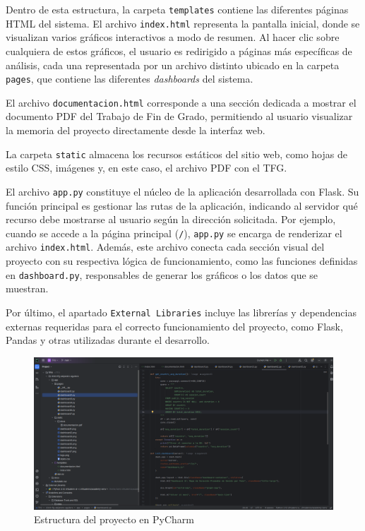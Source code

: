 \documentclass[a4paper, 12pt]{book}
\begin{document}
Dentro de esta estructura, la carpeta \texttt{templates} contiene las diferentes páginas HTML del sistema. El archivo \texttt{index.html} representa la pantalla inicial, donde se visualizan varios gráficos interactivos a modo de resumen. Al hacer clic sobre cualquiera de estos gráficos, el usuario es redirigido a páginas más específicas de análisis, cada una representada por un archivo distinto ubicado en la carpeta \texttt{pages}, que contiene las diferentes \textit{dashboards} del sistema.

El archivo \texttt{documentacion.html} corresponde a una sección dedicada a mostrar el documento PDF del Trabajo de Fin de Grado, permitiendo al usuario visualizar la memoria del proyecto directamente desde la interfaz web.

La carpeta \texttt{static} almacena los recursos estáticos del sitio web, como hojas de estilo CSS, imágenes y, en este caso, el archivo PDF con el TFG.

El archivo \texttt{app.py} constituye el núcleo de la aplicación desarrollada con Flask. Su función principal es gestionar las rutas de la aplicación, indicando al servidor qué recurso debe mostrarse al usuario según la dirección solicitada. Por ejemplo, cuando se accede a la página principal (\texttt{/}), \texttt{app.py} se encarga de renderizar el archivo \texttt{index.html}. Además, este archivo conecta cada sección visual del proyecto con su respectiva lógica de funcionamiento, como las funciones definidas en \texttt{dashboard.py}, responsables de generar los gráficos o los datos que se muestran.

Por último, el apartado \texttt{External Libraries} incluye las librerías y dependencias externas requeridas para el correcto funcionamiento del proyecto, como Flask, Pandas y otras utilizadas durante el desarrollo.

\begin{figure}[h!]
    \centering
    \includegraphics[width=1.1\textwidth]{img/pycharm.png}
    \caption{Estructura del proyecto en PyCharm}
    \label{fig:pycharm_project}
\end{figure}
\end{document}

